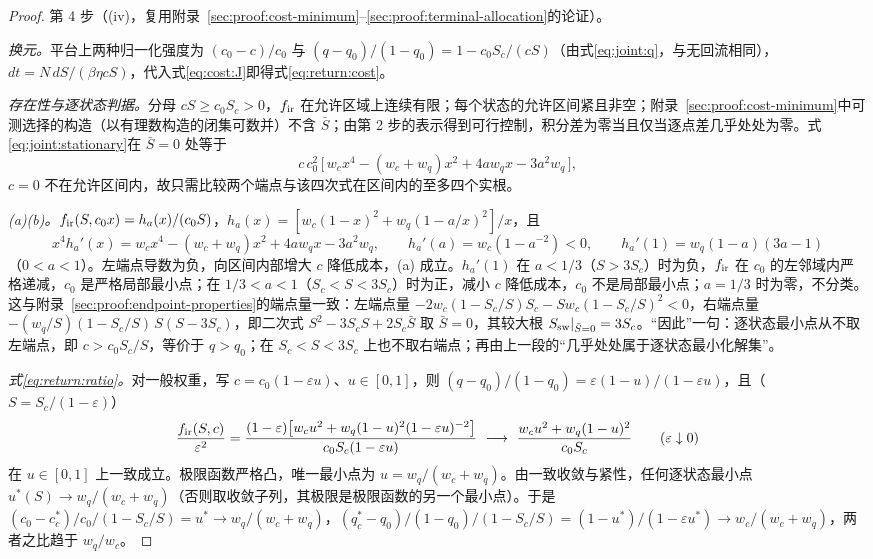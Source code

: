 \begin{proof}
第 4 步（(iv)，复用附录~\ref{sec:proof:cost-minimum}--\ref{sec:proof:terminal-allocation}的论证）。

\emph{换元。}平台上两种归一化强度为 $(c_0-c)/c_0$ 与 $(q-q_0)/(1-q_0)=1-c_0S_c/(cS)$（由式\eqref{eq:joint:q}，与无回流相同），$dt=N\,dS/(\beta\eta cS)$，代入式\eqref{eq:cost:J}即得式\eqref{eq:return:cost}。

\emph{存在性与逐状态判据。}分母 $cS\ge c_0S_c>0$，$f_{\rm ir}$ 在允许区域上连续有限；每个状态的允许区间紧且非空；附录~\ref{sec:proof:cost-minimum}中可测选择的构造（以有理数构造的闭集可数并）不含 $\bar S$；由第 2 步的表示得到可行控制，积分差为零当且仅当逐点差几乎处处为零。式\eqref{eq:joint:stationary}在 $\bar S=0$ 处等于
\[
c\,c_0^2\,\bigl[\,w_cx^4-(w_c+w_q)x^2+4aw_qx-3a^2w_q\,\bigr],
\]
$c=0$ 不在允许区间内，故只需比较两个端点与该四次式在区间内的至多四个实根。

\emph{(a)(b)。}$f_{\rm ir}(S,c_0x)=h_a(x)/(c_0S)$，$h_a(x)=[w_c(1-x)^2+w_q(1-a/x)^2]/x$，且
\[
x^4h_a'(x)=w_cx^4-(w_c+w_q)x^2+4aw_qx-3a^2w_q,\qquad
h_a'(a)=w_c(1-a^{-2})<0,\qquad
h_a'(1)=w_q(1-a)(3a-1)
\]
（$0<a<1$）。左端点导数为负，向区间内部增大 $c$ 降低成本，(a) 成立。$h_a'(1)$ 在 $a<1/3$（$S>3S_c$）时为负，$f_{\rm ir}$ 在 $c_0$ 的左邻域内严格递减，$c_0$ 是严格局部最小点；在 $1/3<a<1$（$S_c<S<3S_c$）时为正，减小 $c$ 降低成本，$c_0$ 不是局部最小点；$a=1/3$ 时为零，不分类。这与附录~\ref{sec:proof:endpoint-properties}的端点量一致：左端点量 $-2w_c(1-S_c/S)S_c-Sw_c(1-S_c/S)^2<0$，右端点量 $-(w_q/S)(1-S_c/S)\,S(S-3S_c)$，即二次式 $S^2-3S_cS+2S_c\bar S$ 取 $\bar S=0$，其较大根 $S_{\rm sw}|_{\bar S=0}=3S_c$。“因此”一句：逐状态最小点从不取左端点，即 $c>c_0S_c/S$，等价于 $q>q_0$；在 $S_c<S<3S_c$ 上也不取右端点；再由上一段的“几乎处处属于逐状态最小化解集”。

\emph{式\eqref{eq:return:ratio}。}对一般权重，写 $c=c_0(1-\varepsilon u)$、$u\in[0,1]$，则 $(q-q_0)/(1-q_0)=\varepsilon(1-u)/(1-\varepsilon u)$，且（$S=S_c/(1-\varepsilon)$）
\[
\frac{f_{\rm ir}(S,c)}{\varepsilon^2}=\frac{(1-\varepsilon)\bigl[w_cu^2+w_q(1-u)^2(1-\varepsilon u)^{-2}\bigr]}{c_0S_c(1-\varepsilon u)}
\ \longrightarrow\ \frac{w_cu^2+w_q(1-u)^2}{c_0S_c}\qquad(\varepsilon\downarrow0)
\]
在 $u\in[0,1]$ 上一致成立。极限函数严格凸，唯一最小点为 $u=w_q/(w_c+w_q)$。由一致收敛与紧性，任何逐状态最小点 $u^*(S)\to w_q/(w_c+w_q)$（否则取收敛子列，其极限是极限函数的另一个最小点）。于是 $(c_0-c_c^*)/c_0/(1-S_c/S)=u^*\to w_q/(w_c+w_q)$，$(q_c^*-q_0)/(1-q_0)/(1-S_c/S)=(1-u^*)/(1-\varepsilon u^*)\to w_c/(w_c+w_q)$，两者之比趋于 $w_q/w_c$。
\end{proof}


